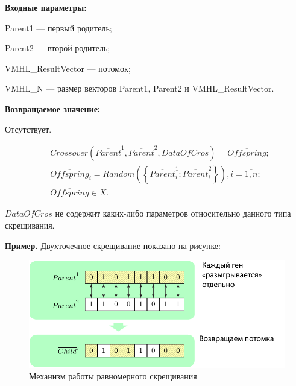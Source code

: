 \textbf{Входные параметры:}
 
 Parent1 --- первый родитель;
 
 Parent2 --- второй родитель;
 
 VMHL\_ResultVector --- потомок;
 
 VMHL\_N --- размер векторов Parent1, Parent2 и VMHL\_ResultVector.

\textbf{Возвращаемое значение:}

 Отсутствует.
 
\begin{align*}
&Crossover \left( \overline{Parent}^1, \overline{Parent}^2, DataOfCros\right) = \overline{Offspring};\\
& \overline{Offspring}_i=Random\left( \left\lbrace \overline{Parent}^1_i;\overline{Parent}^2_i\right\rbrace \right), i=\overline{1,n} ;\nonumber\\
&\overline{Offspring}\in X.\nonumber
\end{align*}

$ DataOfCros $ не содержит каких-либо параметров относительно данного типа скрещивания.

\textbf{Пример.} Двухточечное скрещивание показано на рисунке:

\begin{figure} [h]
  \center
  \includegraphics [scale=0.8] {TMHL_UniformCrossover_Sheme}
  \caption{Механизм работы равномерного скрещивания} 
  \label{img:TMHL_UniformCrossover_Sheme}  
\end{figure}